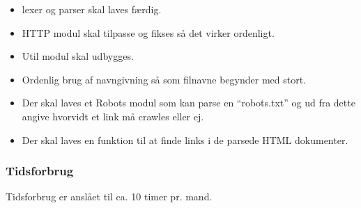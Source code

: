 \begin{itemize}
\item lexer og parser skal laves færdig.
\item HTTP modul skal tilpasse og fikses så det virker ordenligt.
\item Util modul skal udbygges.
\item Ordenlig brug af navngivning så som filnavne begynder med stort.
\item Der skal laves et Robots modul som kan parse en ``robots.txt'' og ud fra dette angive hvorvidt et link må crawles eller ej.
\item Der skal laves en funktion til at finde links i de parsede HTML dokumenter.
\end{itemize}

\subsubsection{Tidsforbrug}

Tidsforbrug er anslået til ca. 10 timer pr. mand.


